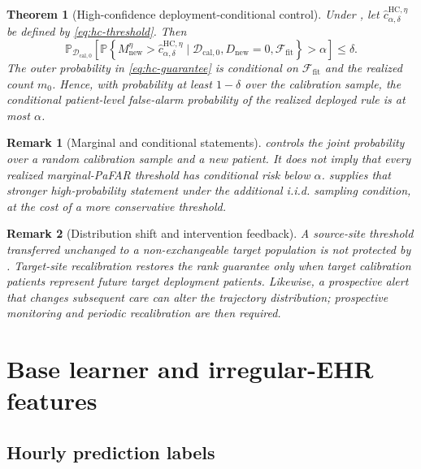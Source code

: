 \documentclass[11pt]{article}
\newtheorem{theorem}{Theorem}
\newtheorem{remark}{Remark}
\newcommand{\Pp}{\mathbb{P}}
\newcommand{\calD}{\mathcal{D}}
\newcommand{\calF}{\mathcal{F}}
\begin{document}
\begin{theorem}[High-confidence deployment-conditional control]\label{thm:hc}
Under , let $\widehat c_{\alpha,\delta}^{\mathrm{HC},\eta}$ be defined by \eqref{eq:hc-threshold}. Then
\begin{equation}
\Pp_{\calD_{\mathrm{cal},0}}\!\left[
\Pp\left\{M_{\mathrm{new}}^{\eta}>
\widehat c_{\alpha,\delta}^{\mathrm{HC},\eta}
\mid\calD_{\mathrm{cal},0},D_{\mathrm{new}}=0,
\calF_{\mathrm{fit}}\right\}>\alpha
\right]\le\delta.
\label{eq:hc-guarantee}
\end{equation}
The outer probability in \eqref{eq:hc-guarantee} is conditional on $\calF_{\mathrm{fit}}$ and the realized count $m_0$. Hence, with probability at least $1-\delta$ over the calibration sample, the conditional patient-level false-alarm probability of the realized deployed rule is at most $\alpha$.
\end{theorem}

\begin{remark}[Marginal and conditional statements]
 controls the joint probability over a random calibration sample and a new patient. It does not imply that every realized marginal-PaFAR threshold has conditional risk below $\alpha$.  supplies that stronger high-probability statement under the additional i.i.d. sampling condition, at the cost of a more conservative threshold.
\end{remark}

\begin{remark}[Distribution shift and intervention feedback]
A source-site threshold transferred unchanged to a non-exchangeable target population is not protected by . Target-site recalibration restores the rank guarantee only when target calibration patients represent future target deployment patients. Likewise, a prospective alert that changes subsequent care can alter the trajectory distribution; prospective monitoring and periodic recalibration are then required.
\end{remark}
\section{Base learner and irregular-EHR features}\label{sec:learner}

\subsection{Hourly prediction labels}
\end{document}
